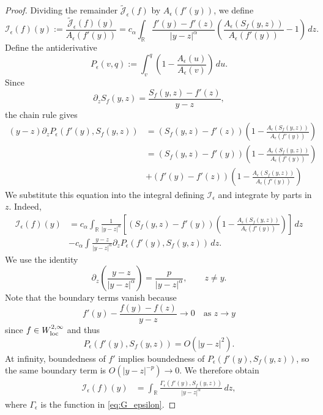 \documentclass[11pt]{amsart}
\theoremstyle{definition}
\theoremstyle{remark}
\numberwithin{equation}{section}
\newcommand{\sq}[1]{\widetilde{#1}}
\newcommand{\R}{\mathbb{R}}
\newcommand{\mc}[1]{\mathcal{#1}}
\begin{document}
\begin{proof}
    Dividing the remainder $\sq{\mc{J}}_\epsilon(f)$ by $A_\epsilon(f'(y))$, we define
    \begin{equation}\label{eqn:analysis_divided_remainder}
        \mc{I}_\epsilon(f)(y)
        :=\frac{\sq{\mc{J}}_\epsilon(f)(y)}{A_\epsilon(f'(y))}
        =c_\alpha\int_{\R}\frac{f'(y)-f'(z)}{|y-z|^\alpha}
        \left(\frac{A_\epsilon(S_f(y,z))}{A_\epsilon(f'(y))}-1\right)\,dz.
    \end{equation}
    Define the antiderivative
    \[
        P_\epsilon(v,q):=\int_v^q\left(1-\frac{A_\epsilon(u)}{A_\epsilon(v)}\right)\,du.
    \]
    Since 
    \[\partial_z S_f(y, z) = \frac{S_f(y, z) - f'(z)}{y - z},\]
    the chain rule gives
    \begin{equation}\label{eqn:analysis_secant_integration_by_parts}
    \begin{aligned}
        (y-z)\partial_zP_\epsilon(f'(y),S_f(y,z)) & = \left(S_f(y, z) - f'(z)\right)\left(1-\frac{A_\epsilon(S_f(y,z))}{A_\epsilon(f'(y))}\right) \\
        & = \left(S_f(y, z) - f'(y)\right)\left(1-\frac{A_\epsilon(S_f(y,z))}{A_\epsilon(f'(y))}\right) \\
        & + \left(f'(y) - f'(z)\right)\left(1-\frac{A_\epsilon(S_f(y,z))}{A_\epsilon(f'(y))}\right)
    \end{aligned}
    \end{equation}
    We substitute this equation into the integral defining $\mc{I}_\epsilon$ and integrate by parts in $z$. Indeed, 
    \begin{align*}
        \mc{I}_\epsilon(f)(y)
        &=c_\alpha\int_{\R}\frac{1}{|y-z|^\alpha}
        \left[(S_f(y, z) - f'(y)) \left(1 - \frac{A_\epsilon(S_f(y,z))}{A_\epsilon(f'(y))}\right)\right]\,dz \\
        & -c_\alpha \int  \frac{y - z}{|y - z|^\alpha} \partial_z P_\epsilon(f'(y),S_f(y,z))\,dz.
    \end{align*}
    We use the identity
    \[
        \partial_z\left(\frac{y-z}{|y-z|^\alpha}\right)
        =\frac{p}{|y-z|^\alpha},\qquad z\ne y.
    \]
    Note that the boundary terms vanish because
    \[f'(y) - \frac{f(y) - f(z)}{y - z} \to 0 \quad \text{as } z \to y\]
    since $f \in W^{2,\infty}_{\textup{loc}}$ and thus
    \[
        P_\epsilon(f'(y),S_f(y,z)) = O(|y-z|^{2}).
    \]
    At infinity, boundedness of $f'$ implies boundedness of $P_\epsilon(f'(y),S_f(y,z))$, so the same boundary term is $O(|y-z|^{-p})\to0$. We therefore obtain
    \begin{align*}
        \mc{I}_\epsilon(f)(y)
        &=\int_{\R}\frac{\Gamma_\epsilon(f'(y),S_f(y,z))}{|y-z|^\alpha}\,dz,
    \end{align*}
    where $\Gamma_\epsilon$ is the function in \eqref{eq:G_epsilon}.
\end{proof}
\end{document}
